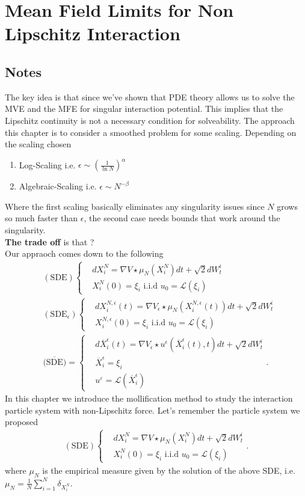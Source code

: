 \chapter{Mean Field Limits for Non Lipschitz Interaction}
\section*{Notes}
The key idea is that since we've shown that PDE theory allows us to solve 
the MVE and the MFE for singular interaction potential. This implies 
that the Lipschitz continuity is not a necessary condition for solveability.
The approach this chapter is to consider a smoothed problem for some scaling.
Depending on the scaling chosen 
\begin{enumerate}
  \item Log-Scaling i.e. $\epsilon \sim (\frac{1}{\ln N})^{\alpha} $
  \item   Algebraic-Scaling i.e. $\epsilon \sim N^{-\beta } $
\end{enumerate}
Where the first scaling basically eliminates any singularity issues since $N$ grows so much faster than $\epsilon$,
the second case needs bounds that work around the singularity.\\[1ex]
{\bf The trade off} is that ? 
\\[1ex]
Our appraoch comes down to the following  
\begin{align*}
  &(\text{SDE})\begin{cases}
&dX_i^N = \nabla V \star  \mu_N(X_i^{N} ) dt + \sqrt{2}dW_t^i\\
&X_i^N(0) = \xi_i \text{ i.i.d } u_{0}=\mathcal{L}(\xi_i)
\end{cases}\\
  &(\text{SDE}_\epsilon)\begin{cases}
 &dX_i^{N,\epsilon}(t) = \nabla V_\epsilon \star  \mu_N(X_i^{N,\epsilon}(t) ) dt + \sqrt{2}dW_t^i\\
 &X_i^{N,\epsilon}(0) = \xi_i \text{ i.i.d } u_{0}=\mathcal{L}(\xi_i)
 \end{cases}\\
  &\overline{\text{(SDE)}}=\begin{cases}
&d \overline{X}_i^{\epsilon} (t)= \nabla V_{\epsilon} \star  u^{\epsilon} (\overline{X}^{\epsilon}_i(t),t )  dt + \sqrt{2}dW_t^i\\
&\overline{X}^{\epsilon}_i = \xi_i \\
&u^\varepsilon = \mathcal{L}(\overline{X}_i^\epsilon )
\end{cases}
.\end{align*}
In this chapter we introduce the mollification method to study the interaction particle system with non-Lipschitz force. Let's remember the particle system we proposed
\begin{align*}
(\text{SDE})\begin{cases}
&dX_i^N = \nabla V \star  \mu_N(X_i^{N} ) dt + \sqrt{2}dW_t^i\\
&X_i^N(0) = \xi_i \text{ i.i.d } u_{0}=\mathcal{L}(\xi_i)
\end{cases}
.\end{align*}  
where $\mu_N$ is the empirical measure given by the solution of the above SDE, i.e. $\mu_N = \frac{1}{N} \sum_{i=1}^{N} \delta_{X_i^N}$.

